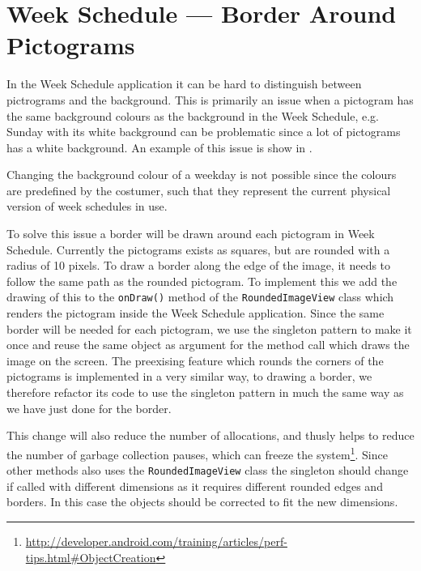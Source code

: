 \section{Week Schedule --- Border Around Pictograms}
\begin{center}
\end{center}

In the Week Schedule application it can be hard to distinguish between pictrograms and the background.
This is primarily an issue when a pictogram has the same background colours as the background in the Week Schedule, e.g. Sunday with its white background can be problematic since a lot of pictograms has a white background.
An example of this issue is show in  .

Changing the background colour of a weekday is not possible since the colours are predefined by the costumer, such that they represent the current physical version of week schedules in use.

To solve this issue a border will be drawn around each pictogram in Week Schedule.
Currently the pictograms exists as squares, but are rounded with a radius of 10 pixels.
To draw a border along the edge of the image, it needs to follow the same path as the rounded pictogram.
To implement this we add the drawing of this to the \texttt{onDraw()} method of the \texttt{RoundedImageView} class which renders the pictogram inside the Week Schedule application.
Since the same border will be needed for each pictogram, we use the singleton pattern to make it once and reuse the same object as argument for the method call which draws the image on the screen.
The preexising feature which rounds the corners of the pictograms is implemented in a very similar way, to drawing a border, we therefore refactor its code to use the singleton pattern in much the same way as we have just done for the border.

This change will also reduce the number of allocations, and  thusly helps to reduce the number of garbage collection pauses, which can freeze the system\footnote{\url{http://developer.android.com/training/articles/perf-tips.html\#ObjectCreation}}.
Since other methods also uses the \texttt{RoundedImageView} class the singleton should change if called with different dimensions as it requires different rounded edges and borders.
In this case the objects should be corrected to fit the new dimensions.


